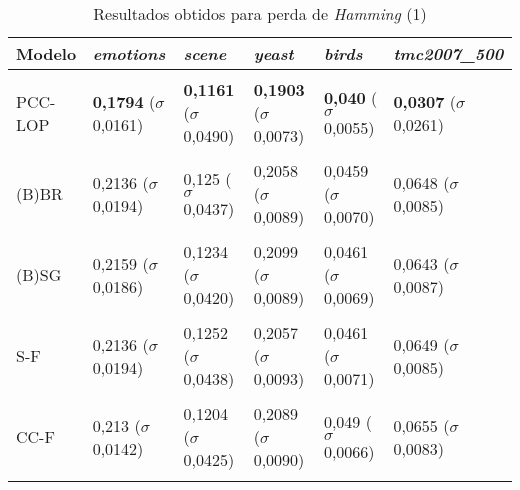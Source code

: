 \begin{table}[htbp]
	\centering
	\caption{Resultados obtidos para perda de \textit{{Hamming}} (1)}
		\begin{tabular}
        { p{0.88in} p{0.88in} p{0.88in} p{0.88in} p{0.88in} p{0.88in} }
        
        \hline
Modelo & \textit{emotions} & \textit{scene} & \textit{yeast} & \textit{birds} & \textit{tmc2007\_500} \\ 
\hline \\

PCC-LOP & \textbf{0,1794} \newline ($\sigma$ 0,0161) & \textbf{0,1161} \newline ($\sigma$ 0,0490) & \textbf{0,1903} \newline ($\sigma$ 0,0073) & \textbf{0,040} \newline ($\sigma$ 0,0055) & \textbf{0,0307} \newline ($\sigma$ 0,0261) \\ \\
(B)BR & 0,2136 \newline ($\sigma$ 0,0194) & 0,125 \newline ($\sigma$ 0,0437) & 0,2058 \newline ($\sigma$ 0,0089) & 0,0459 \newline ($\sigma$ 0,0070) & 0,0648 \newline ($\sigma$ 0,0085) \\ \\
(B)SG & 0,2159 \newline ($\sigma$ 0,0186) & 0,1234 \newline ($\sigma$ 0,0420) & 0,2099 \newline ($\sigma$ 0,0089) & 0,0461 \newline ($\sigma$ 0,0069) & 0,0643 \newline ($\sigma$ 0,0087) \\ \\
S-F & 0,2136 \newline ($\sigma$ 0,0194) & 0,1252 \newline ($\sigma$ 0,0438) & 0,2057 \newline ($\sigma$ 0,0093) & 0,0461 \newline ($\sigma$ 0,0071) & 0,0649 \newline ($\sigma$ 0,0085) \\ \\
CC-F & 0,213 \newline ($\sigma$ 0,0142) & 0,1204 \newline ($\sigma$ 0,0425) & 0,2089 \newline ($\sigma$ 0,0090) & 0,049 \newline ($\sigma$ 0,0066) & 0,0655 \newline ($\sigma$ 0,0083) \\ \\

\end{tabular}
\end{table}
